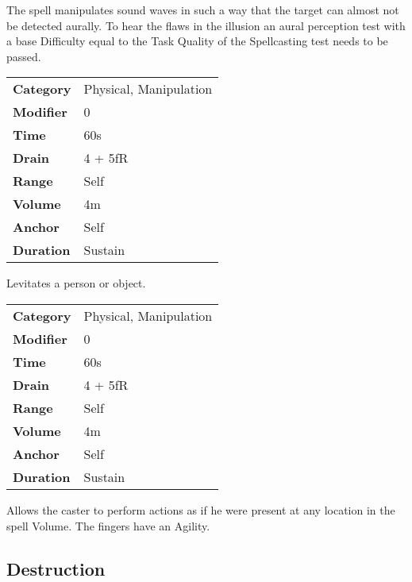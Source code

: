 \hfil

The spell manipulates sound waves in such a way that the target
can almost not be detected aurally. To hear the flaws in the illusion an
aural perception test with a base Difficulty equal to the Task
Quality of the
Spellcasting test needs to be passed.



\begin{tabular}{ll}
    \textbf{Category} & Physical, Manipulation \\
    \textbf{Modifier} & 0                      \\
    \textbf{Time}     & 60s                    \\
    \textbf{Drain}    & 4 + 5fR                \\
    \textbf{Range}    & Self                   \\
    \textbf{Volume}   & 4m                     \\
    \textbf{Anchor}   & Self                   \\
    \textbf{Duration} & Sustain                \\
\end{tabular}

\hfil

Levitates a person or object.



\begin{tabular}{ll}
    \textbf{Category} & Physical, Manipulation \\
    \textbf{Modifier} & 0                      \\
    \textbf{Time}     & 60s                    \\
    \textbf{Drain}    & 4 + 5fR                \\
    \textbf{Range}    & Self                   \\
    \textbf{Volume}   & 4m                     \\
    \textbf{Anchor}   & Self                   \\
    \textbf{Duration} & Sustain                \\
\end{tabular}

\hfil

Allows the caster to perform actions as if he were present at
any location in the spell Volume. The fingers have
an Agility.

\subsection{Destruction}


